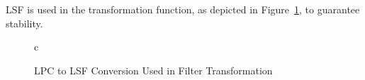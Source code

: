 LSF is used in the transformation function, as depicted in Figure~\ref{fig:lpc_to_lsf}, to guarantee stability.
\begin{figure}[htbp]
	\centering
	\begin{tabular}[h]{c}
	\end{tabular}
	\caption{LPC to LSF Conversion Used in Filter Transformation}
	\label{fig:lpc_to_lsf}
\end{figure}

% 
% 
% 
